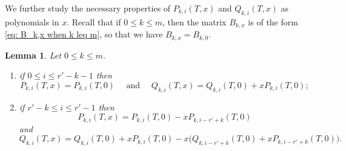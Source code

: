 \documentclass[11pt]{amsart}
\theoremstyle{definition}
\numberwithin{equation}{subsection}
\theoremstyle{plain}
\theoremstyle{plain}
\theoremstyle{plain}
\theoremstyle{plain}
\theoremstyle{plain}
\theoremstyle{plain}
\theoremstyle{plain}
\theoremstyle{plain}
\theoremstyle{plain}
\newtheorem{lemm}[equation]{Lemma}
\theoremstyle{plain}
\theoremstyle{plain}
\theoremstyle{plain}
\theoremstyle{definition}
\theoremstyle{definition}
\theoremstyle{definition}
\theoremstyle{remark}
\renewcommand{\(}{\textup{(}}
\renewcommand{\)}{\textup{)}}
\begin{document}
We further study the necessary properties of $P_{k,i}(T,x)$ and $Q_{k,i}(T,x)$ as polynomials in $x$. Recall that if $0\leq k\leq m$, then the matrix $B_{k,x}$ is of the form \eqref{eq: B_k,x when k leq m}, so that we have $B_{k,x}=B_{k,0}$.

\begin{lemm}\label{lemma-PQ-k leq m}
Let $0\leq k\leq m$.
\begin{enumerate}[leftmargin=*]
\item if $0\leq i\leq r'-k-1$ then
$$P_{k,i}(T,x)=P_{k,i}(T,0)\quad\mbox{ and }\quad Q_{k,i}(T,x)=Q_{k,i}(T,0)+xP_{k,i}(T,0);$$
\item if $r'-k\leq i\leq r'-1$ then
$$P_{k,i}(T,x)=P_{k,i}(T,0)-xP_{k,i-r'+k}(T,0)$$
and
$$Q_{k,i}(T,x)=Q_{k,i}(T,0)+xP_{k,i}(T,0)-x\big(Q_{k,i-r'+k}(T,0)+xP_{k,i-r'+k}(T,0)\big).$$
\end{enumerate}
\end{lemm}
\end{document}
